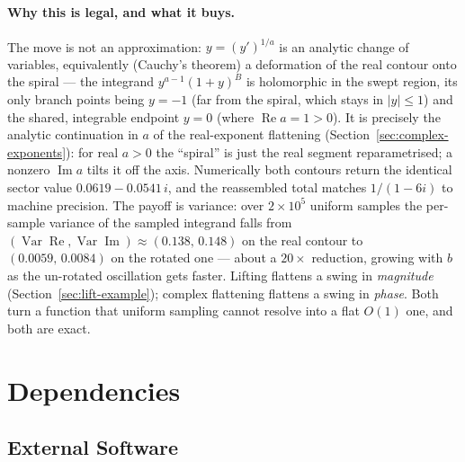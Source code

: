 \documentclass[11pt,a4paper]{article}
\begin{document}
\paragraph{Why this is legal, and what it buys.} The move is not an
approximation: $y=(y')^{1/a}$ is an analytic change of variables, equivalently
(Cauchy's theorem) a deformation of the real contour onto the spiral --- the
integrand $y^{a-1}(1+y)^{B}$ is holomorphic in the swept region, its only
branch points being $y=-1$ (far from the spiral, which stays in $|y|\le1$) and
the shared, integrable endpoint $y=0$ (where $\operatorname{Re}a=1>0$). It is
precisely the analytic continuation in $a$ of the real-exponent flattening
(Section~\ref{sec:complex-exponents}): for real $a>0$ the ``spiral'' is just the
real segment reparametrised; a nonzero $\operatorname{Im}a$ tilts it off the
axis. Numerically both contours return the identical sector value
$0.0619 - 0.0541\,i$, and the reassembled total matches $1/(1-6i)$ to machine
precision. The payoff is variance: over $2\times10^{5}$ uniform samples the
per-sample variance of the sampled integrand falls from
$(\operatorname{Var}\operatorname{Re},\operatorname{Var}\operatorname{Im})
\approx(0.138,\,0.148)$ on the real contour to $(0.0059,\,0.0084)$ on the
rotated one --- about a $20\times$ reduction, growing with $b$ as the
un-rotated oscillation gets faster. Lifting flattens a swing in
\emph{magnitude} (Section~\ref{sec:lift-example}); complex flattening flattens a
swing in \emph{phase}. Both turn a function that uniform sampling cannot resolve
into a flat $O(1)$ one, and both are exact.

\section{Dependencies}

\subsection{External Software}
\end{document}
